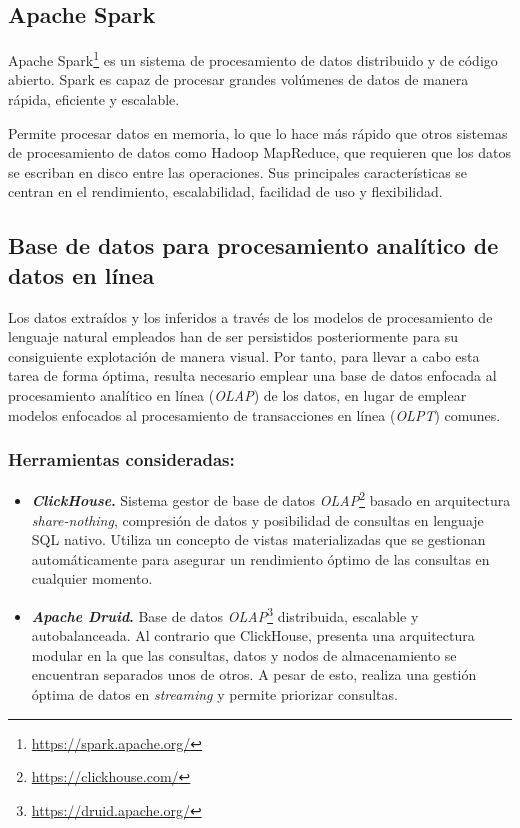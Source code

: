 \subsection{Apache Spark}

Apache Spark\footnote{\url{https://spark.apache.org/}} es un sistema de procesamiento de datos distribuido y de código abierto. Spark es capaz de procesar grandes volúmenes de datos de manera rápida, eficiente y escalable.

Permite procesar datos en memoria, lo que lo hace más rápido que otros sistemas de procesamiento de datos como Hadoop MapReduce, que requieren que los datos se escriban en disco entre las operaciones. Sus principales características se centran en el rendimiento, escalabilidad, facilidad de uso y flexibilidad.

\subsection{Base de datos para procesamiento analítico de datos en línea}

Los datos extraídos y los inferidos a través de los modelos de procesamiento de lenguaje natural empleados han de ser persistidos posteriormente para su consiguiente explotación de manera visual. Por tanto, para llevar a cabo esta tarea de forma óptima, resulta necesario emplear una base de datos enfocada al procesamiento analítico en línea (\textit{OLAP}) de los datos, en lugar de emplear modelos enfocados al procesamiento de transacciones en línea (\textit{OLPT}) comunes.

\subsubsection{Herramientas consideradas:}

\begin{itemize}
    \item \textbf{\textit{ClickHouse}.} Sistema gestor de base de datos \textit{OLAP}\footnote{\url{https://clickhouse.com/}} basado en arquitectura \textit{share-nothing}, compresión de datos y posibilidad de consultas en lenguaje SQL nativo. Utiliza un concepto de vistas materializadas que se gestionan automáticamente para asegurar un rendimiento óptimo de las consultas en cualquier momento.
    
    \item \textbf{\textit{Apache Druid}.} Base de datos \textit{OLAP}\footnote{\url{https://druid.apache.org/}} distribuida, escalable y autobalanceada. Al contrario que ClickHouse, presenta una arquitectura modular en la que las consultas, datos y nodos de almacenamiento se encuentran separados unos de otros. A pesar de esto, realiza una gestión óptima de datos en \textit{streaming} y permite priorizar consultas.
\end{itemize}


